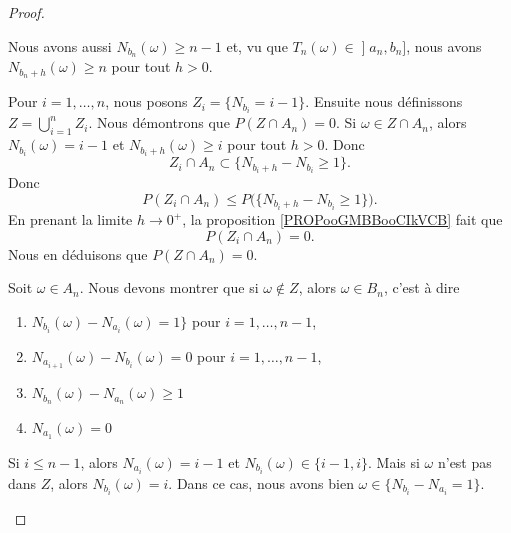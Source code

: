 \begin{proof}
\begin{subproof}
\begin{subproof}
Nous avons aussi \( N_{b_n}(\omega)\geq n-1\) et, vu que \( T_n(\omega)\in \mathopen] a_n , b_n \mathclose]\), nous avons \( N_{b_n+h}(\omega)\geq n\) pour tout \( h>0\).
        \end{subproof}
        Pour \( i=1,\ldots, n\), nous posons \( Z_i=\{ N_{b_i}=i-1 \}\). Ensuite nous définissons \( Z=\bigcup_{i=1}^nZ_i\). Nous démontrons que \( P(Z\cap A_n)=0\). Si \( \omega\in Z\cap A_n\), alors \( N_{b_i}(\omega)=i-1\) et \( N_{b_i+h}(\omega)\geq i\) pour tout \( h>0\). Donc
        \begin{equation}
            Z_i\cap A_n\subset\{ N_{b_i+h}-N_{b_i}\geq 1 \}.
        \end{equation}
        Donc
        \begin{equation}
            P(Z_i\cap A_n)\leq P\big( \{ N_{b_i+h}-N_{b_i}\geq 1 \} \big).
        \end{equation}
        En prenant la limite \( h\to 0^+\), la proposition \ref{PROPooGMBBooCIkVCB} fait que
        \begin{equation}
            P(Z_i\cap A_n)=0.
        \end{equation}
        Nous en déduisons que \( P(Z\cap A_n)=0\).

        Soit \( \omega\in A_n\). Nous devons montrer que si \( \omega\notin Z\), alors \( \omega\in B_n\), c'est à dire
        \begin{enumerate}
            \item
            $ N_{b_i}(\omega)-N_{a_i}(\omega)=1 \}$ pour \( i=1,\ldots, n-1\),
        \item
           $N_{a_{i+1}}(\omega)-N_{b_i}(\omega)=0$ pour \( i=1,\ldots, n-1\),
       \item
           
       $N_{b_n}(\omega)-N_{a_n}(\omega)\geq 1$
   \item
   $N_{a_1}(\omega)=0$
        \end{enumerate}

        Si \( i\leq n-1\), alors \( N_{a_i}(\omega)=i-1\) et \( N_{b_i}(\omega)\in \{ i-1,i \}\). Mais si \( \omega\) n'est pas dans \( Z\), alors \( N_{b_i}(\omega)=i\). Dans ce cas, nous avons bien \( \omega\in\{ N_{b_i}-N_{a_i}=1 \}\).


\end{subproof}
\end{proof}
